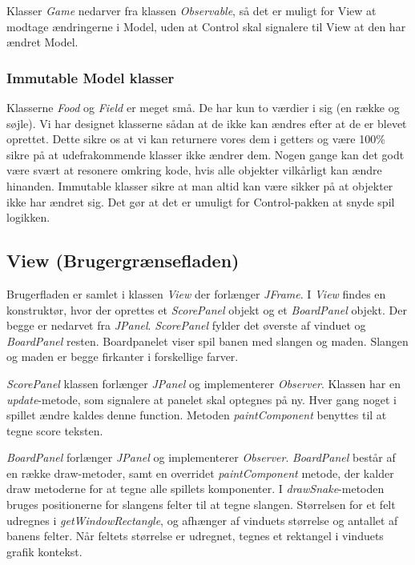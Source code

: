 Klasser \textit{Game} nedarver fra klassen \textit{Observable}, så det er muligt for View at modtage ændringerne i Model, uden at Control skal signalere til View at den har ændret Model.

\subsubsection{Immutable Model klasser}
Klasserne \textit{Food} og \textit{Field} er meget små. De har kun to værdier i sig (en række og søjle). Vi har designet klasserne sådan at de ikke kan ændres efter at de er blevet oprettet. Dette sikre os at vi kan returnere vores dem i getters og være 100\% sikre på at udefrakommende klasser ikke ændrer dem. Nogen gange kan det godt være svært at resonere omkring kode, hvis alle objekter vilkårligt kan ændre hinanden. Immutable klasser sikre at man altid kan være sikker på at objekter ikke har ændret sig. Det gør at det er umuligt for Control-pakken at snyde spil logikken.


\subsection{View (Brugergrænsefladen)}
Brugerfladen er samlet i klassen \textit{View} der forlænger \textit{JFrame}. I \textit{View} findes en konstruktør, hvor der oprettes et \textit{ScorePanel} objekt og et \textit{BoardPanel} objekt. Der begge er nedarvet fra \textit{JPanel}. \textit{ScorePanel} fylder det øverste af vinduet og \textit{BoardPanel} resten. Boardpanelet viser spil banen med slangen og maden. Slangen og maden er begge firkanter i forskellige farver.

\textit{ScorePanel} klassen forlænger \textit{JPanel} og implementerer \textit{Observer}. Klassen har en \textit{update}-metode, som signalere at panelet skal optegnes på ny. Hver gang noget i spillet ændre kaldes denne function. Metoden \textit{paintComponent} benyttes til at tegne score teksten.

\textit{BoardPanel} forlænger \textit{JPanel} og implementerer \textit{Observer}. \textit{BoardPanel} består af en række draw-metoder, samt en overridet \textit{paintComponent} metode, der kalder draw metoderne for at tegne alle spillets komponenter. I \textit{drawSnake}-metoden bruges positionerne for slangens felter til at tegne slangen. Størrelsen for et felt udregnes i \textit{getWindowRectangle}, og afhænger af vinduets størrelse og antallet af banens felter. Når feltets størrelse er udregnet, tegnes et rektangel i vinduets grafik kontekst. 


